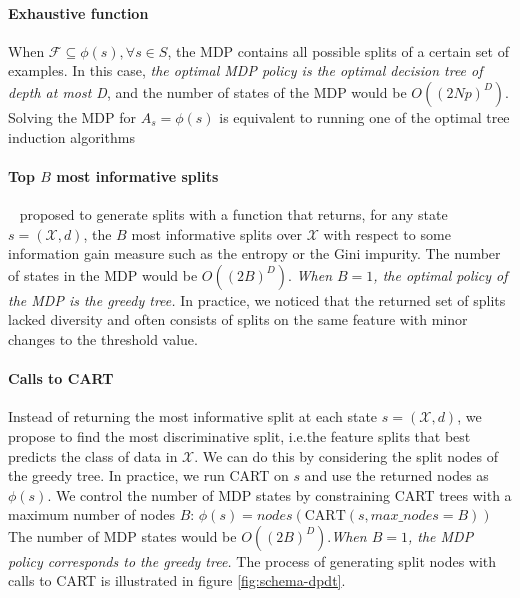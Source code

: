 \paragraph{Exhaustive function} When $\mathcal{F} \subseteq \phi(s), \forall s \in S$, the MDP contains all possible splits of a certain set of examples. In this case, \textit{the optimal MDP policy is the optimal decision tree of depth at most D},
and the number of states of the MDP would be $O({(2Np)}^D)$. Solving the MDP for $A_s = \phi(s)$ is equivalent to running one of the optimal tree induction algorithms~\cite{verwer2017learning,oct,pystreed,quantbnb,binoct,murtree,mfoct,blossom,lin2020generalized,chaouki2024branchesfastdynamicprogramming}

\paragraph{Top $B$ most informative splits}\label{topk-heuristic}~\cite{topk} proposed to generate splits with a function that returns, for any state $s=(\mathcal{X},d)$, the $B$ most informative splits over $\mathcal{X}$ with respect to some information gain measure such as the entropy or the Gini impurity. 
The number of states in the MDP would be $O({(2B)}^D)$. \textit{When $B=1$, the optimal policy of the MDP is the greedy tree.} 
In practice, we noticed that the returned set of splits lacked diversity and often consists of splits on the same feature with minor changes to the threshold value. 

\paragraph{Calls to CART}\label{cart-heuristic} Instead of returning the most informative split at each state $s=(\mathcal{X},d)$, we propose to find the most discriminative split, i.e.\@ the feature splits that best predicts the class of data in $\mathcal{X}$.
We can do this by considering the split nodes of the greedy tree. In practice, we run CART on $s$ and use the returned nodes as $\phi(s)$. We control the number of MDP states by constraining CART trees with a maximum number of nodes $B$: $\phi(s) = nodes(\text{CART}(s, max\_nodes=B))$
The number of MDP states would be $O({(2B)}^D)$.\textit{When $B=1$, the MDP policy corresponds to the greedy tree.} The process of generating split nodes with calls to CART is illustrated in figure \ref{fig:schema-dpdt}.

